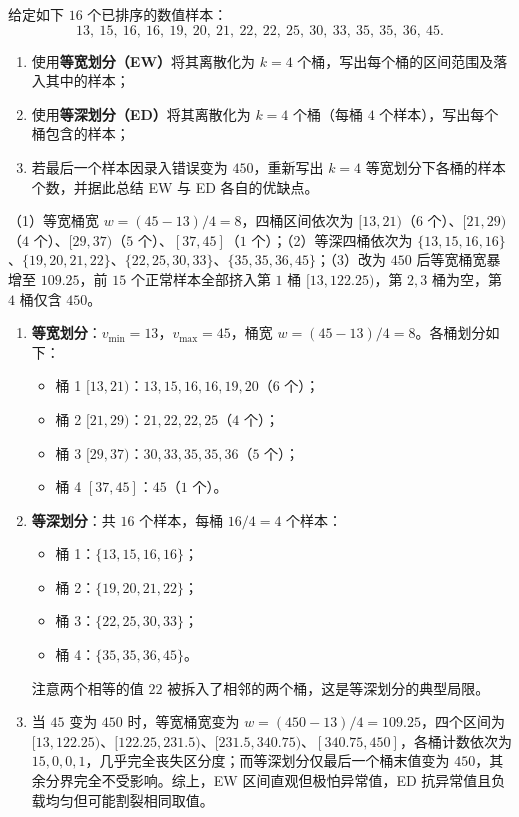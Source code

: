 \begin{exercise}[title={等宽划分（EW）与等深划分（ED）手算对比},level=standard,points=15,tags={离散化,等宽划分,等深划分}]
给定如下 $16$ 个已排序的数值样本：
\[
  13,\ 15,\ 16,\ 16,\ 19,\ 20,\ 21,\ 22,\ 22,\ 25,\ 30,\ 33,\ 35,\ 35,\ 36,\ 45.
\]
\begin{enumerate}
  \item 使用\textbf{等宽划分（EW）}将其离散化为 $k=4$ 个桶，写出每个桶的区间范围及落入其中的样本；
  \item 使用\textbf{等深划分（ED）}将其离散化为 $k=4$ 个桶（每桶 $4$ 个样本），写出每个桶包含的样本；
  \item 若最后一个样本因录入错误变为 $450$，重新写出 $k=4$ 等宽划分下各桶的样本个数，并据此总结 EW 与 ED 各自的优缺点。
\end{enumerate}
\begin{answer}
（1）等宽桶宽 $w=(45-13)/4=8$，四桶区间依次为 $[13,21)$（$6$ 个）、$[21,29)$（$4$ 个）、$[29,37)$（$5$ 个）、$[37,45]$（$1$ 个）；（2）等深四桶依次为 $\{13,15,16,16\}$、$\{19,20,21,22\}$、$\{22,25,30,33\}$、$\{35,35,36,45\}$；（3）改为 $450$ 后等宽桶宽暴增至 $109.25$，前 $15$ 个正常样本全部挤入第 $1$ 桶 $[13, 122.25)$，第 $2,3$ 桶为空，第 $4$ 桶仅含 $450$。
\end{answer}
\begin{solution}
\begin{enumerate}
  \item \textbf{等宽划分}：$v_{\min}=13$，$v_{\max}=45$，桶宽 $w = (45 - 13)/4 = 8$。各桶划分如下：
  \begin{itemize}
    \item 桶 1 $[13, 21)$：$13, 15, 16, 16, 19, 20$（$6$ 个）；
    \item 桶 2 $[21, 29)$：$21, 22, 22, 25$（$4$ 个）；
    \item 桶 3 $[29, 37)$：$30, 33, 35, 35, 36$（$5$ 个）；
    \item 桶 4 $[37, 45]$：$45$（$1$ 个）。
  \end{itemize}
  \item \textbf{等深划分}：共 $16$ 个样本，每桶 $16/4 = 4$ 个样本：
  \begin{itemize}
    \item 桶 1：$\{13, 15, 16, 16\}$；
    \item 桶 2：$\{19, 20, 21, 22\}$；
    \item 桶 3：$\{22, 25, 30, 33\}$；
    \item 桶 4：$\{35, 35, 36, 45\}$。
  \end{itemize}
  注意两个相等的值 $22$ 被拆入了相邻的两个桶，这是等深划分的典型局限。
  \item 当 $45$ 变为 $450$ 时，等宽桶宽变为 $w = (450 - 13)/4 = 109.25$，四个区间为 $[13, 122.25)$、$[122.25, 231.5)$、$[231.5, 340.75)$、$[340.75, 450]$，各桶计数依次为 $15, 0, 0, 1$，几乎完全丧失区分度；而等深划分仅最后一个桶末值变为 $450$，其余分界完全不受影响。综上，EW 区间直观但极怕异常值，ED 抗异常值且负载均匀但可能割裂相同取值。
\end{enumerate}
\end{solution}
\end{exercise}

